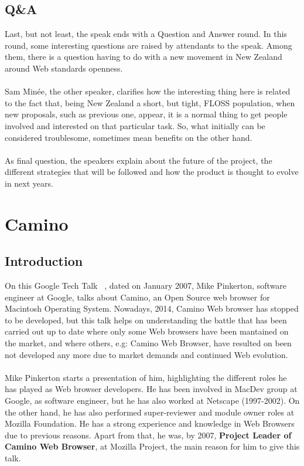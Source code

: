 \documentclass[11pt]{article}
\begin{document}
\subsection{Q\&A}
  Last, but not least, the speak ends with a Question and Answer round. In this round, some interesting questions are raised by attendants to the speak. Among them, there is a question having to do with a new movement in New Zealand around Web standards openness.\\
\\
  Sam Minée, the other speaker, clarifies how the interesting thing here is related to the fact that, being New Zealand a short, but tight, FLOSS population, when new proposals, such as previous one, appear, it is a normal thing to get people involved and interested on that particular task. So, what initially can be considered troublesome, sometimes mean benefits on the other hand.\\
\\
As final question, the speakers explain about the future of the project, the different strategies that will be followed and how the product is thought to evolve in next years.

\pagebreak

\section{Camino}
\label{sec:camino}

\subsection{Introduction}
On this Google Tech Talk ~\cite{TALK03}, dated on January 2007, Mike Pinkerton, software engineer at Google, talks about Camino, an Open Source web browser for Macintosh Operating System. Nowadays, 2014, Camino Web browser has stopped to be developed, but this talk helps on understanding the battle that has been carried out up to date where only some Web browsers have been mantained on the market, and where others, e.g: Camino Web Browser, have resulted on been not developed any more due to market demands and continued Web evolution.\\
\\
Mike Pinkerton starts a presentation of him, highlighting the different roles he has played as Web browser developers. He has been involved in MacDev group at Google, as software engineer, but he has also worked at Netscape (1997-2002). On the other hand, he has also performed super-reviewer and module owner roles at Mozilla Foundation. He has a strong experience and knowledge in Web Browsers due to previous reasons. Apart from that, he was, by 2007, \textbf{Project Leader of Camino Web Browser}, at Mozilla Project, the main reason for him to give this talk.
\end{document}
